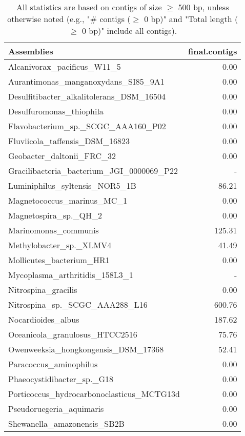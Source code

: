 \documentclass[12pt,a4paper]{article}
\begin{document}
\begin{table}[ht]
\begin{center}
\caption{All statistics are based on contigs of size $\geq$ 500 bp, unless otherwise noted (e.g., "\# contigs ($\geq$ 0 bp)" and "Total length ($\geq$ 0 bp)" include all contigs).}
\begin{tabular}{|l*{1}{|r}|}
\hline
Assemblies & final.contigs \\ \hline
Alcanivorax\_pacificus\_W11\_5 & 0.00 \\ \hline
Aurantimonas\_manganoxydans\_SI85\_9A1 & 0.00 \\ \hline
Desulfitibacter\_alkalitolerans\_DSM\_16504 & 0.00 \\ \hline
Desulfuromonas\_thiophila & 0.00 \\ \hline
Flavobacterium\_sp.\_SCGC\_AAA160\_P02 & 0.00 \\ \hline
Fluviicola\_taffensis\_DSM\_16823 & 0.00 \\ \hline
Geobacter\_daltonii\_FRC\_32 & 0.00 \\ \hline
Gracilibacteria\_bacterium\_JGI\_0000069\_P22 & - \\ \hline
Luminiphilus\_syltensis\_NOR5\_1B & 86.21 \\ \hline
Magnetococcus\_marinus\_MC\_1 & 0.00 \\ \hline
Magnetospira\_sp.\_QH\_2 & 0.00 \\ \hline
Marinomonas\_communis & 125.31 \\ \hline
Methylobacter\_sp.\_XLMV4 & 41.49 \\ \hline
Mollicutes\_bacterium\_HR1 & 0.00 \\ \hline
Mycoplasma\_arthritidis\_158L3\_1 & - \\ \hline
Nitrospina\_gracilis & 0.00 \\ \hline
Nitrospina\_sp.\_SCGC\_AAA288\_L16 & 600.76 \\ \hline
Nocardioides\_albus & 187.62 \\ \hline
Oceanicola\_granulosus\_HTCC2516 & 75.76 \\ \hline
Owenweeksia\_hongkongensis\_DSM\_17368 & 52.41 \\ \hline
Paracoccus\_aminophilus & 0.00 \\ \hline
Phaeocystidibacter\_sp.\_G18 & 0.00 \\ \hline
Porticoccus\_hydrocarbonoclasticus\_MCTG13d & 0.00 \\ \hline
Pseudoruegeria\_aquimaris & 0.00 \\ \hline
Shewanella\_amazonensis\_SB2B & 0.00 \\ \hline

\end{tabular}
\end{center}
\end{table}
\end{document}
